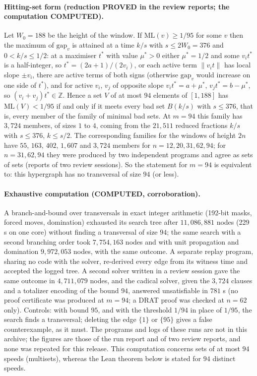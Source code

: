 \documentclass[11pt]{article}
\theoremstyle{remark}
\newcommand{\norm}[1]{\lVert #1\rVert}
\newcommand{\ML}{\mathrm{ML}}
\newcommand{\gap}{\mathrm{gap}}
\newcommand{\Z}{\mathbb{Z}}
\begin{document}
\paragraph{Hitting-set form (reduction PROVED in the review reports; the computation COMPUTED).} Let $W_0=188$ be the height of the window. If $\ML(v)\ge1/95$ for some $v$ then the maximum of $\gap_v$ is attained at a time $k/s$ with $s\le2W_0=376$ and $0<k/s\le1/2$: at a maximiser $t^*$ with value $\mu^*>0$ either $\mu^*=1/2$ and some $v_it^*$ is a half-integer, so $t^*=(2a+1)/(2v_i)$, or each active term $\norm{v_it}$ has local slope $\pm v_i$, there are active terms of both signs (otherwise $\gap_v$ would increase on one side of $t^*$), and for active $v_i$, $v_j$ of opposite slope $v_it^*=a+\mu^*$, $v_jt^*=b-\mu^*$, so $(v_i+v_j)t^*\in\Z$. Hence a set $V$ of at most $94$ elements of $[1,188]$ has $\ML(V)<1/95$ if and only if it meets every bad set $B(k/s)$ with $s\le376$, that is, every member of the family of minimal bad sets. At $m=94$ this family has $3{,}724$ members, of sizes $1$ to $4$, coming from the $21{,}511$ reduced fractions $k/s$ with $s\le376$, $k\le s/2$. The corresponding families for the windows of height $2n$ have $55$, $163$, $402$, $1{,}607$ and $3{,}724$ members for $n=12,20,31,62,94$; for $n=31,62,94$ they were produced by two independent programs and agree as sets of sets (reports of two review sessions). So the statement for $m=94$ is equivalent to: this hypergraph has no transversal of size $94$ (or less).

\paragraph{Exhaustive computation (COMPUTED, corroboration).} A branch-and-bound over transversals in exact integer arithmetic (192-bit masks, forced moves, domination) exhausted its search tree after $11{,}086{,}881$ nodes (229 s on one core) without finding a transversal of size $94$; the same search with a second branching order took $7{,}754{,}163$ nodes and with unit propagation and domination $9{,}972{,}053$ nodes, with the same outcome. A separate replay program, sharing no code with the solver, re-derived every edge from its witness time and accepted the logged tree. A second solver written in a review session gave the same outcome in $4{,}711{,}079$ nodes, and the cadical solver, given the $3{,}724$ clauses and a totalizer encoding of the bound $94$, answered unsatisfiable in $781$ s (no proof certificate was produced at $m=94$; a DRAT proof was checked at $n=62$ only). Controls: with bound $95$, and with the threshold $1/94$ in place of $1/95$, the search finds a transversal; deleting the edge $\{1\}$ or $\{95\}$ gives a false counterexample, as it must. The programs and logs of these runs are not in this archive; the figures are those of the run report and of two review reports, and none was repeated for this release. This computation concerns sets of at most $94$ speeds (multisets), whereas the Lean theorem below is stated for $94$ distinct speeds.
\end{document}
